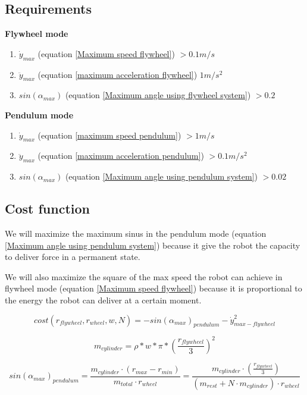 \subsection{Requirements}
\textbf{Flywheel mode}
\begin{enumerate}
	\item $\dot{y}_{max}$ (equation \ref{Maximum speed flywheel}) $> 0.1m/s$
	\item $\ddot{y}_{max}$ (equation \ref{maximum acceleration flywheel}) $1m/s^2$
	\item $sin(\alpha_{max})$ (equation \ref{Maximum angle using flywheel system}) $> 0.2$
\end{enumerate}
\textbf{Pendulum mode}
\begin{enumerate}
	\item $\dot{y}_{max}$ (equation \ref{maximum speed pendulum}) $> 1m/s$
	\item $\ddot{y}_{max}$ (equation \ref{maximum acceleration pendulum}) $>0.1m/s^2$
	\item $sin(\alpha_{max})$ (equation \ref{Maximum angle using pendulum system}) $> 0.02$
\end{enumerate}
	


\subsection{Cost function}
We will maximize the maximum sinus in the pendulum mode 
(equation \ref{Maximum angle using pendulum system}) because
it give the robot the capacity to deliver force in a permanent state.

We will also maximize the square of the max speed the robot can achieve
in flywheel mode (equation \ref{Maximum speed flywheel}) because it is
proportional to the energy the robot can deliver at a certain moment.

\begin{equation}
	cost(r_{flywheel},r_{wheel},w,N) = - sin(\alpha_{max})_{pendulum} -\dot{y}^2_{max-flywheel}
	\label{eq: cost}
\end{equation}

\begin{equation*}
	m_{cylinder} = \rho * w * \pi * (\frac{r_{flywheel}}{3})^2
\end{equation*}

\begin{equation*}
	sin(\alpha_{max})_{pendulum} = \frac{m_{cylinder} \cdot  (r_{max} - r_{min})}{m_{total} \cdot r_{wheel}} = \frac{m_{cylinder} \cdot  (\frac{r_{flywheel}}{3})}{(m_{rest} + N \cdot m_{cylinder})\cdot r_{wheel}} 	
\end{equation*}

